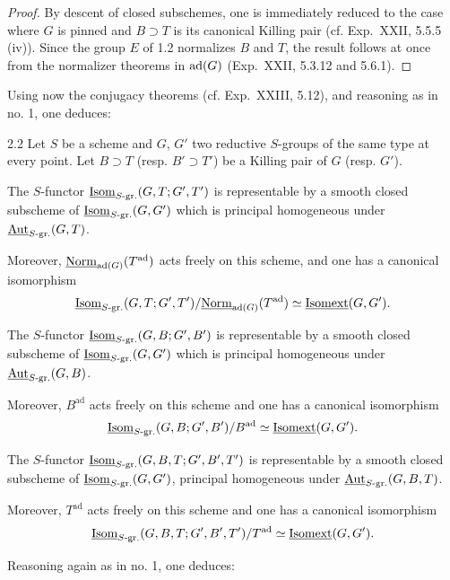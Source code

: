\begin{proof}
By descent of closed subschemes, one is immediately reduced to the case where $G$ is pinned and $B\supset T$ is its canonical Killing pair (cf. Exp.~XXII, 5.5.5 (iv)). Since the group $E$ of 1.2 normalizes $B$ and $T$, the result follows at once from the normalizer theorems in $\operatorname{ad}(G)$ (Exp.~XXII, 5.3.12 and 5.6.1).
\end{proof}
Using now the conjugacy theorems (cf. Exp.~XXIII, 5.12), and reasoning as in no. 1, one deduces:
\begin{corollary}{2.2}\label{XXIV.2.2}
Let $S$ be a scheme and $G$, $G'$ two reductive $S$-groups of the same type at every point. Let $B\supset T$ (resp. $B'\supset T'$) be a Killing pair of $G$ (resp. $G'$).
\begin{enumeratei}
\item The $S$-functor $\underline{\operatorname{Isom}}_{S\text{-gr.}}(G,T;G',T')$ is representable by a smooth closed subscheme of $\underline{\operatorname{Isom}}_{S\text{-gr.}}(G,G')$ which is principal homogeneous under $\underline{\operatorname{Aut}}_{S\text{-gr.}}(G,T)$.

Moreover, $\underline{\mathrm{Norm}}_{\operatorname{ad}(G)}(T^{\mathrm{ad}})$ acts freely on this scheme, and one has a canonical isomorphism
\[
\underline{\operatorname{Isom}}_{S\text{-gr.}}(G,T;G',T')/\underline{\mathrm{Norm}}_{\operatorname{ad}(G)}(T^{\mathrm{ad}})\simeq\underline{\operatorname{Isomext}}(G,G').
\]
\item The $S$-functor $\underline{\operatorname{Isom}}_{S\text{-gr.}}(G,B;G',B')$ is representable by a smooth closed subscheme of $\underline{\operatorname{Isom}}_{S\text{-gr.}}(G,G')$ which is principal homogeneous under $\underline{\operatorname{Aut}}_{S\text{-gr.}}(G,B)$.

Moreover, $B^{\mathrm{ad}}$ acts freely on this scheme and one has a canonical isomorphism
\[
\underline{\operatorname{Isom}}_{S\text{-gr.}}(G,B;G',B')/B^{\mathrm{ad}}\simeq\underline{\operatorname{Isomext}}(G,G').
\]
\item The $S$-functor $\underline{\operatorname{Isom}}_{S\text{-gr.}}(G,B,T;G',B',T')$ is representable by a smooth closed subscheme of $\underline{\operatorname{Isom}}_{S\text{-gr.}}(G,G')$, principal homogeneous under $\underline{\operatorname{Aut}}_{S\text{-gr.}}(G,B,T)$.

Moreover, $T^{\mathrm{ad}}$ acts freely on this scheme and one has a canonical isomorphism
\[
\underline{\operatorname{Isom}}_{S\text{-gr.}}(G,B,T;G',B',T')/T^{\mathrm{ad}}\simeq\underline{\operatorname{Isomext}}(G,G').
\]
\end{enumeratei}
\end{corollary}
Reasoning again as in no. 1, one deduces:
